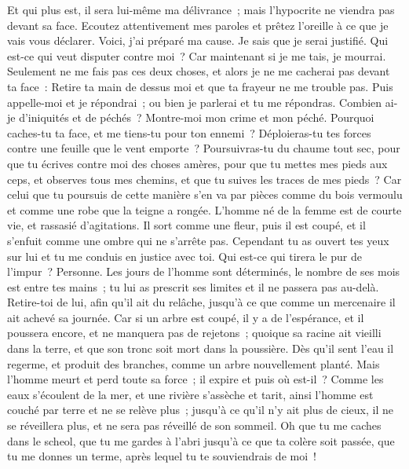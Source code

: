 \begin{multicols}{2}
Et qui plus est, il sera lui-même ma délivrance~; mais l'hypocrite ne viendra pas devant sa face.
Ecoutez attentivement mes paroles et prêtez l'oreille à ce que je vais vous déclarer.
Voici, j'ai préparé ma cause. Je sais que je serai justifié.
Qui est-ce qui veut disputer contre moi~? Car maintenant si je me tais, je mourrai.
Seulement ne me fais pas ces deux choses, et alors je ne me cacherai pas devant ta face~:
Retire ta main de dessus moi et que ta frayeur ne me trouble pas.
Puis appelle-moi et je répondrai~; ou bien je parlerai et tu me répondras.
Combien ai-je d'iniquités et de péchés~? Montre-moi mon crime et mon péché.
Pourquoi caches-tu ta face, et me tiens-tu pour ton ennemi~?
Déploieras-tu tes forces contre une feuille que le vent emporte~? Poursuivras-tu du chaume tout sec,
pour que tu écrives contre moi des choses amères,
pour que tu mettes mes pieds aux ceps, et observes tous mes chemins, et que tu suives les traces de mes pieds~?
Car celui que tu poursuis de cette manière s'en va par pièces comme du bois vermoulu et comme une robe que la teigne a rongée.
\VerseOne{}L'homme né de la femme est de courte vie, et rassasié d'agitations.
Il sort comme une fleur, puis il est coupé, et il s'enfuit comme une ombre qui ne s'arrête pas.
Cependant tu as ouvert tes yeux sur lui et tu me conduis en justice avec toi.
Qui est-ce qui tirera le pur de l'impur~? Personne.
Les jours de l'homme sont déterminés, le nombre de ses mois est entre tes mains~; tu lui as prescrit ses limites et il ne passera pas au-delà.
Retire-toi de lui, afin qu'il ait du relâche, jusqu'à ce que comme un mercenaire il ait achevé sa journée.
Car si un arbre est coupé, il y a de l'espérance, et il poussera encore, et ne manquera pas de rejetons~;
quoique sa racine ait vieilli dans la terre, et que son tronc soit mort dans la poussière.
Dès qu'il sent l'eau il regerme, et produit des branches, comme un arbre nouvellement planté.
Mais l'homme meurt et perd toute sa force~; il expire et puis où est-il~?
Comme les eaux s'écoulent de la mer, et une rivière s'assèche et tarit,
 ainsi l'homme est couché par terre et ne se relève plus~; jusqu'à ce qu'il n'y ait plus de cieux, il ne se réveillera plus, et ne sera pas réveillé de son sommeil.
Oh que tu me caches dans le scheol, que tu me gardes à l'abri jusqu'à ce que ta colère soit passée, que tu me donnes un terme, après lequel tu te souviendrais de moi~!

\end{multicols}
